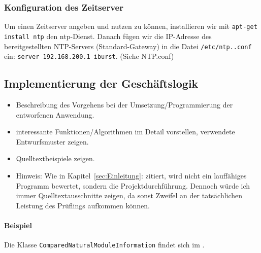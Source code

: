\subsubsection{Konfiguration des Zeitserver}
\label{subsubsec:KonfigurationNTP}
Um einen Zeitserver angeben und nutzen zu können, installieren wir mit \verb+apt-get install ntp+ den ntp-Dienst. Danach fügen wir die IP-Adresse des bereitgestellten NTP-Servers (Standard-Gateway) in die Datei \verb+/etc/ntp..conf+ ein: \verb+server 192.168.200.1 iburst+. (Siehe NTP.conf)




\subsection{Implementierung der Geschäftslogik}
\label{sec:ImplementierungGeschaeftslogik}

\begin{itemize}
	\item Beschreibung des Vorgehens bei der Umsetzung/Programmierung der entworfenen Anwendung.
	\item \Ggfs interessante Funktionen/Algorithmen im Detail vorstellen, verwendete Entwurfsmuster zeigen.
	\item Quelltextbeispiele zeigen.
	\item Hinweis: Wie in Kapitel~\ref{sec:Einleitung}:  zitiert, wird nicht ein lauffähiges Programm bewertet, sondern die Projektdurchführung. Dennoch würde ich immer Quelltextausschnitte zeigen, da sonst Zweifel an der tatsächlichen Leistung des Prüflings aufkommen können.
\end{itemize}

\paragraph{Beispiel}
Die Klasse \texttt{Com\-par\-ed\-Na\-tu\-ral\-Mo\-dule\-In\-for\-ma\-tion} findet sich im .  


